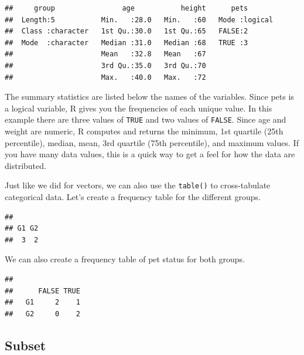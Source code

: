 \documentclass[
]{book}
\newenvironment{Shaded}{\begin{snugshade}}{\end{snugshade}}
\newcommand{\KeywordTok}[1]{\textcolor[rgb]{0.13,0.29,0.53}{\textbf{#1}}}
\newcommand{\NormalTok}[1]{#1}
\newcommand{\OperatorTok}[1]{\textcolor[rgb]{0.81,0.36,0.00}{\textbf{#1}}}
\begin{document}
\begin{verbatim}
##     group                age           height      pets        
##  Length:5           Min.   :28.0   Min.   :60   Mode :logical  
##  Class :character   1st Qu.:30.0   1st Qu.:65   FALSE:2        
##  Mode  :character   Median :31.0   Median :68   TRUE :3        
##                     Mean   :32.8   Mean   :67                  
##                     3rd Qu.:35.0   3rd Qu.:70                  
##                     Max.   :40.0   Max.   :72
\end{verbatim}

The summary statistics are listed below the names of the variables. Since pets is a logical variable, R gives you the frequencies of each unique value. In this example there are three values of \texttt{TRUE} and two values of \texttt{FALSE}. Since age and weight are numeric, R computes and returns the minimum, 1st quartile (25th percentile), median, mean, 3rd quartile (75th percentile), and maximum values. If you have many data values, this is a quick way to get a feel for how the data are distributed.

Just like we did for vectors, we can also use the \texttt{table()} to cross-tabulate categorical data. Let's create a frequency table for the different groups.

\begin{Shaded}
\end{Shaded}

\begin{verbatim}
## 
## G1 G2 
##  3  2
\end{verbatim}

We can also create a frequency table of pet status for both groups.

\begin{Shaded}
\end{Shaded}

\begin{verbatim}
##     
##      FALSE TRUE
##   G1     2    1
##   G2     0    2
\end{verbatim}

\hypertarget{subset}{%
\subsection*{Subset}\label{subset}}
\end{document}
